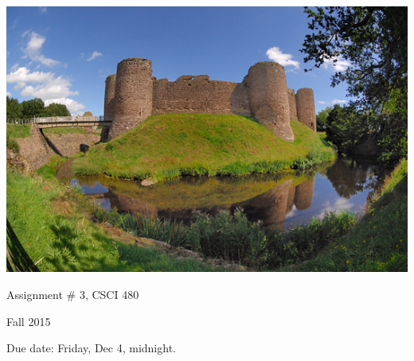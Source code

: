 \documentclass{article}
\begin{document}
\centerline{\includegraphics[scale=1.2]{whitecastlereflected.jpg}}

\bigskip
\centerline{\LARGE Assignment \# 3, CSCI 480}
  \centerline{\Large Fall 2015}
\centerline{\large Due date: Friday, Dec 4, midnight.}
\end{document}
